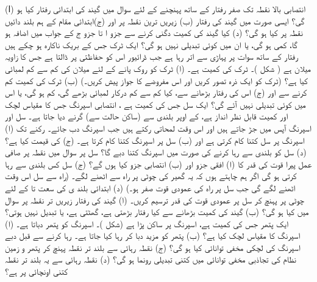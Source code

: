 (ا) انتصابی بالا نقطہ تک صفر رفتار کے ساتھ پہنچنے کے لئے سوال  میں  گیند کی  ابتدائی  رفتار کیا ہو گی؟ ایسی صورت میں   گیند کی رفتار (ب) زیریں ترین نقطہ پر اور (ج)ابتدائی مقام کے ہم بلند  دائیں نقطہ پر  کیا ہو گی؟ (د) کیا   گیند کی کمیت دگنی کرنے سے جزو ا تا جزو ج کے جواب میں اضافہ  ہو گا، کمی ہو گی، یا ان میں کوئی تبدیلی نہیں ہو گی؟
ایک ٹرک جس کے بریک ناکارہ ہو چکے ہیں  رفتار  کے ساتھ سوات     پر  پہاڑی  سے اتر رہا ہے جب ڈرائیور اس  کو حفاظتی   پر ڈالتا ہے جس کا زاویہ میلان  ہے ( شکل  )۔ ٹرک کی کمیت  ہے۔ (ا)  ٹرک کو روک پانے  کے لئے میلان کی کم سے کم لمبائی  کیا ہے؟ (ٹرک کو ایک ذرہ تصور کریں اور اس مفروضے کا جواز پیش کریں۔)  (ب)  ٹرک کی کمیت  کم کرنے سے اور (ج) اس کی رفتار بڑھانے سے، کیا کم سے کم درکار  لمبائی  بڑھے گی، کم ہو گی، یا اس میں کوئی تبدیلی نہیں آئے گی؟
ایک سل جس  کی کمیت  ہے ، انتصابی اسپرنگ  جس کا مقیاس لچک   اور کمیت قابل نظر انداز ہے،  کے اوپر    بلندی سے (ساکن حالت سے) گرنے دیا جاتا ہے۔ سل اور اسپرنگ  آپس میں جڑ جاتے  ہیں اور اس وقت لمحاتی رکتے  ہیں جب اسپرنگ  دب جائے۔ رکنے تک  (ا) اسپرنگ پر سل کتنا کام کرتی ہے اور (ب) سل پر اسپرنگ کتنا کام کرتا ہے۔ (ج)    کی قیمت کیا ہے؟ (د) سل کو  بلندی سے رہا کرنے کی صورت میں اسپرنگ کتنا دبے گا؟
سل پر  سوال  میں   نقطہ  پر صافی  عمل پیرا قوت  کی قدر  کا (ا) افقی جزو اور (ب) انتصابی جزو کیا ہوں گے؟ (ج)  سل  کس بلندی  سے رہا کرتی ہو گی اگر ہم چاہتے ہوں کہ   یہ  گھیر کی چوٹی پر   راہ سے اٹھنے لگے۔ (راہ سے سل اس وقت اٹھنے لگے گی جب   سل  پر راہ کی  عمودی قوت صفر ہو۔) (د)  ابتدائی بلند ی کی سعت  تا   کے لئے چوٹی پر  پہنچ کر   سل پر عمودی قوت  کی قدر ترسیم کریں۔
(ا) گیند کی  رفتار  زیریں تر نقطہ پر سوال  میں کیا ہو گی؟ (ب)   گیند کی کمیت بڑھانے سے کیا رفتار بڑھتی ہے، گھٹتی ہے، یا تبدیل نہیں ہوتی؟
ایک پتھر جس کی کمیت  ہے، اسپرنگ پر ساکن پڑا ہے (شکل )۔ اسپرنگ کو پتھر  دباتا ہے۔ (ا) اسپرنگ کا مقیاس لچک کیا ہے؟ (ب)  پتھر کو مزید  دبا کر رہا کیا جاتا ہے۔ رہا کرنے سے قبل دبے اسپرنگ کی لچکی مخفی توانائی کیا ہو گی؟ (ج)  نقطہ رہائی سے بلند تر نقطہ پہنچ کر  پتھر و زمین نظام کی تجاذبی مخفی توانائی میں کتنی تبدیلی رونما ہو گی؟ (د)  نقطہ رہائی سے یہ بلند تر نقطہ کتنی اونچائی پر ہے؟
